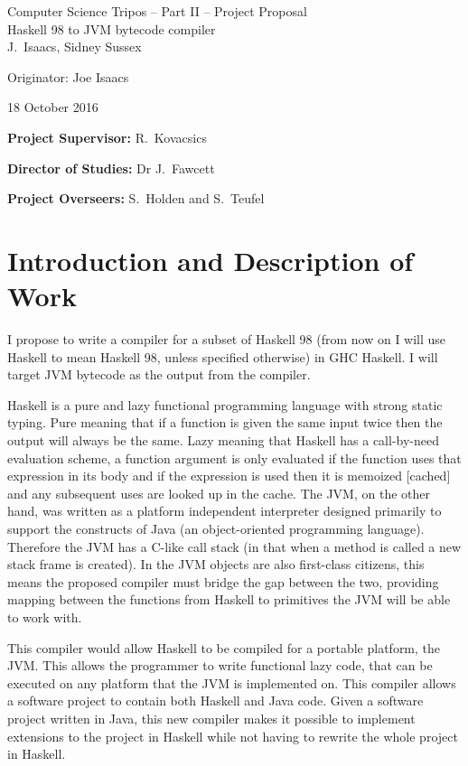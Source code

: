 \documentclass[12pt,a4paper,twoside]{article}
\begin{document}
\begin{center}
  \Large
  Computer Science Tripos -- Part II -- Project Proposal\\[4mm]
  \LARGE
  Haskell 98 to JVM bytecode compiler\\[4mm]

  \large
  J.~Isaacs, Sidney Sussex

  Originator: Joe Isaacs 

  18 October 2016
\end{center}

\vspace{5mm}

\textbf{Project Supervisor:} R.~Kovacsics

\textbf{Director of Studies:} Dr J.~Fawcett 

\textbf{Project Overseers:} S.~Holden and S.~Teufel



\section*{Introduction and Description of Work}

  I propose to write a compiler for a subset of Haskell 98 (from now on I will use Haskell to mean Haskell 98, unless specified otherwise)
  in GHC Haskell. I will target JVM bytecode as the output from the compiler.



  Haskell is a pure and lazy functional programming language with strong static typing. Pure meaning that
  if a function is given the same input twice then the output will always be the same. Lazy meaning that Haskell has a
  call-by-need evaluation scheme, a function argument is only evaluated if the function uses that expression in its body
  and if the expression is used then it is memoized [cached] and any subsequent uses are looked up in the cache.
  The JVM, on the other hand, was written as a platform independent interpreter designed
  primarily to support the constructs of Java (an object-oriented programming language).
  Therefore the JVM has a C-like call stack (in that when a method is called a new stack frame is created). In the JVM objects are also first-class citizens, this means
  the proposed compiler must bridge the gap between the two, providing mapping between the functions from Haskell to primitives
  the JVM will be able to work with.

  This compiler would allow Haskell to be compiled for a portable platform, the JVM. This allows the programmer to
  write functional lazy code, that can be executed on any platform that the JVM is implemented on. This compiler allows a software project to contain both
  Haskell and Java code. Given a software project written in Java, this new compiler makes it possible to implement extensions to the project in Haskell
  while not having to rewrite the whole project in Haskell.
\end{document}
